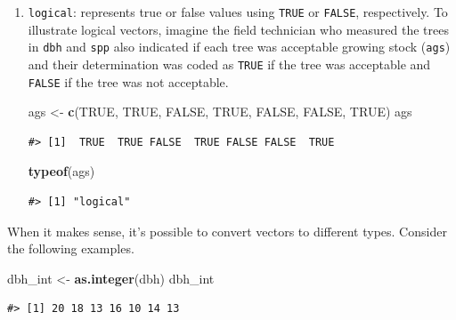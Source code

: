 \documentclass[
  11pt,
]{krantz}
\newenvironment{Shaded}{\begin{snugshade}}{\end{snugshade}}
\newcommand{\KeywordTok}[1]{\textcolor[rgb]{0.13,0.29,0.53}{\textbf{#1}}}
\newcommand{\NormalTok}[1]{#1}
\newcommand{\OtherTok}[1]{\textcolor[rgb]{0.56,0.35,0.01}{#1}}
\newcommand{\StringTok}[1]{\textcolor[rgb]{0.31,0.60,0.02}{#1}}
\theoremstyle{definition}
\theoremstyle{definition}
\theoremstyle{definition}
\theoremstyle{definition}
\theoremstyle{remark}
\begin{document}
\begin{enumerate}
\begin{verbatim}
#> [1] "integer"
\end{verbatim}
\item
  \texttt{logical}: represents true or false values using \texttt{TRUE} or \texttt{FALSE}, respectively. To illustrate logical vectors, imagine the field technician who measured the trees in \texttt{dbh} and \texttt{spp} also indicated if each tree was acceptable growing stock (\texttt{ags}) and their determination was coded as \texttt{TRUE} if the tree was acceptable and \texttt{FALSE} if the tree was not acceptable.

\begin{Shaded}
\begin{Highlighting}[]
\NormalTok{ags \textless{}{-}}\StringTok{ }\KeywordTok{c}\NormalTok{(}\OtherTok{TRUE}\NormalTok{, }\OtherTok{TRUE}\NormalTok{, }\OtherTok{FALSE}\NormalTok{, }\OtherTok{TRUE}\NormalTok{, }\OtherTok{FALSE}\NormalTok{, }\OtherTok{FALSE}\NormalTok{, }\OtherTok{TRUE}\NormalTok{)}
\NormalTok{ags}
\end{Highlighting}
\end{Shaded}

\begin{verbatim}
#> [1]  TRUE  TRUE FALSE  TRUE FALSE FALSE  TRUE
\end{verbatim}

\begin{Shaded}
\begin{Highlighting}[]
\KeywordTok{typeof}\NormalTok{(ags)}
\end{Highlighting}
\end{Shaded}

\begin{verbatim}
#> [1] "logical"
\end{verbatim}
\end{enumerate}

When it makes sense, it's possible to convert vectors to different types. Consider the following examples.

\begin{Shaded}
\begin{Highlighting}[]
\NormalTok{dbh\_int \textless{}{-}}\StringTok{ }\KeywordTok{as.integer}\NormalTok{(dbh)}
\NormalTok{dbh\_int}
\end{Highlighting}
\end{Shaded}

\begin{verbatim}
#> [1] 20 18 13 16 10 14 13
\end{verbatim}
\end{document}
